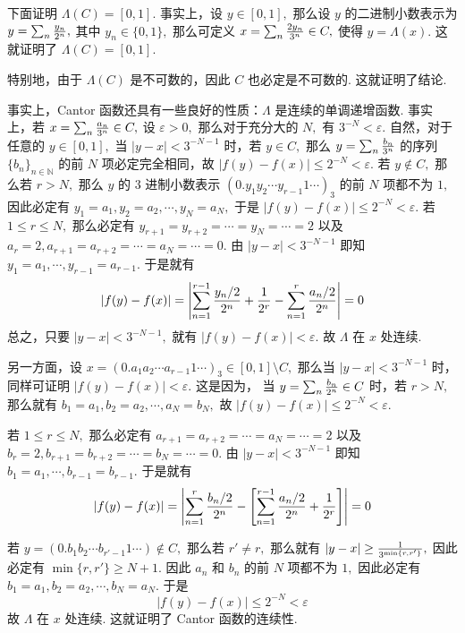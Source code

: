 \documentclass[12pt, a4paper, oneside]{book}
\numberwithin{figure}{section}
\theoremstyle{definition}
\begin{document}
下面证明 $\Lambda(C)=[0,1].$ 事实上，设 $y\in [0,1],$ 那么设 $y$ 的二进制小数表示为 $y=\sum_n {y_n\over 2^n},$ 其中 $y_n\in\{0,1\},$ 那么可定义
$x=\sum_n {2y_n\over 3^n}\in C,$ 使得 $y=\Lambda(x).$ 这就证明了 $\Lambda(C)=[0,1].$

特别地，由于 $\Lambda(C)$ 是不可数的，因此 $C$ 也必定是不可数的. 这就证明了结论.


事实上，Cantor 函数还具有一些良好的性质：$\Lambda$ 是连续的单调递增函数. 事实上，若 $x=\sum_n {a_n\over 3^n}\in C,$ 设 $\varepsilon>0,$ 那么对于充分大的 $N,$ 有 $3^{-N}<\varepsilon.$ 自然，对于任意的 $y\in [0,1],$ 当 $|y-x|<3^{-N-1}$ 时，若 $y\in C,$ 那么 $y=\sum_n {b_n\over 3^n}$ 的序列 $\{b_n\}_{n\in\mathbb N}$ 的前 $N$ 项必定完全相同，故 $|f(y)-f(x)|\leq 2^{-N}<\varepsilon.$ 若 $y\notin C,$ 那么若 $r>N,$ 那么 $y$ 的 $3$ 进制小数表示 $(0.y_1y_2\cdots y_{r-1}1\cdots)_3$ 的前 $N$ 项都不为 $1,$ 因此必定有 $y_1=a_1,y_2=a_2,\cdots,y_N=a_N,$ 于是 $|f(y)-f(x)|\leq 2^{-N}<\varepsilon.$ 
若 $1\leq r\leq N,$ 那么必定有 $y_{r+1}=y_{r+2}=\cdots=y_N=\cdots = 2$ 以及 $a_{r}=2,a_{r+1}=a_{r+2}=\cdots=a_N=\cdots=0.$ 由 $|y-x|<3^{-N-1}$ 即知 $y_1=a_1,\cdots,y_{r-1}=a_{r-1}.$ 于是就有
\begin{equation}
    |f(y)-f(x)|=\left|\sum_{n=1}^{r-1} {y_n/2\over 2^n}+{1\over 2^r}-\sum_{n=1}^{r}{a_n/2\over 2^n}\right|=0
\end{equation}
总之，只要 $|y-x|<3^{-N-1},$ 就有 $|f(y)-f(x)|<\varepsilon.$ 故 $\Lambda$ 在 $x$ 处连续. 

另一方面，设 $x=(0.a_1a_2\cdots a_{r-1}1\cdots)_3\in [0,1]\setminus C,$ 那么当 $|y-x|<3^{-N-1}$ 时，同样可证明 $|f(y)-f(x)|<\varepsilon.$ 这是因为，
当 $y=\sum_n {b_n\over 2^n}\in C$ 时，若 $r>N,$ 那么就有 $b_1=a_1,b_2=a_2,\cdots,a_N=b_N,$ 故 $|f(y)-f(x)|\leq 2^{-N}<\varepsilon.$

若 $1\leq r\leq N,$ 那么必定有 $a_{r+1}=a_{r+2}=\cdots=a_N=\cdots=2$ 以及 $b_{r}=2,b_{r+1}=b_{r+2}=\cdots=b_N=\cdots=0.$ 由 $|y-x|<3^{-N-1}$ 即知 $b_1=a_1,\cdots,b_{r-1}=b_{r-1}.$ 于是就有
\begin{equation}
    |f(y)-f(x)|=\left|\sum_{n=1}^{r} {b_n/2\over 2^n}-\left[\sum_{n=1}^{r-1}{a_n/2\over 2^n}+{1\over 2^r}\right]\right|=0
\end{equation}

若 $y=(0.b_1b_2\cdots b_{r'-1}1\cdots)\notin C,$ 那么若 $r'\neq r,$ 那么就有 $|y-x|\geq {1\over 3^{\min\{r,r'\}}},$ 因此必定有 $\min\{r,r'\}\geq N+1.$ 因此 $a_n$ 和 $b_n$ 的前 $N$ 项都不为 $1,$ 因此必定有 $b_1=a_1,b_2=a_2,\cdots,b_N=a_N.$
于是
\begin{equation}
    |f(y)-f(x)|\leq 2^{-N}<\varepsilon
\end{equation}
故 $\Lambda$ 在 $x$ 处连续. 这就证明了 Cantor 函数的连续性.
\end{document}
